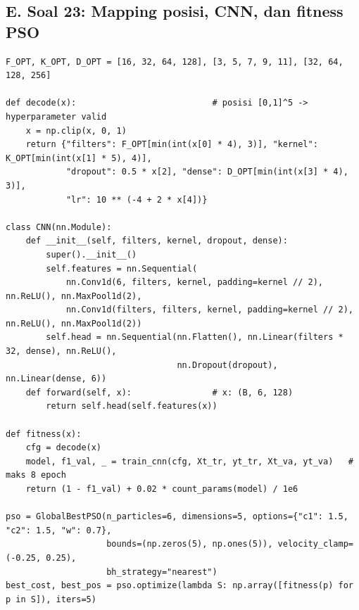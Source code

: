 \subsection*{E. Soal 23: Mapping posisi, CNN, dan fitness PSO}
\begin{lstlisting}
F_OPT, K_OPT, D_OPT = [16, 32, 64, 128], [3, 5, 7, 9, 11], [32, 64, 128, 256]

def decode(x):                           # posisi [0,1]^5 -> hyperparameter valid
    x = np.clip(x, 0, 1)
    return {"filters": F_OPT[min(int(x[0] * 4), 3)], "kernel": K_OPT[min(int(x[1] * 5), 4)],
            "dropout": 0.5 * x[2], "dense": D_OPT[min(int(x[3] * 4), 3)],
            "lr": 10 ** (-4 + 2 * x[4])}

class CNN(nn.Module):
    def __init__(self, filters, kernel, dropout, dense):
        super().__init__()
        self.features = nn.Sequential(
            nn.Conv1d(6, filters, kernel, padding=kernel // 2), nn.ReLU(), nn.MaxPool1d(2),
            nn.Conv1d(filters, filters, kernel, padding=kernel // 2), nn.ReLU(), nn.MaxPool1d(2))
        self.head = nn.Sequential(nn.Flatten(), nn.Linear(filters * 32, dense), nn.ReLU(),
                                  nn.Dropout(dropout), nn.Linear(dense, 6))
    def forward(self, x):                # x: (B, 6, 128)
        return self.head(self.features(x))

def fitness(x):
    cfg = decode(x)
    model, f1_val, _ = train_cnn(cfg, Xt_tr, yt_tr, Xt_va, yt_va)   # maks 8 epoch
    return (1 - f1_val) + 0.02 * count_params(model) / 1e6

pso = GlobalBestPSO(n_particles=6, dimensions=5, options={"c1": 1.5, "c2": 1.5, "w": 0.7},
                    bounds=(np.zeros(5), np.ones(5)), velocity_clamp=(-0.25, 0.25),
                    bh_strategy="nearest")
best_cost, best_pos = pso.optimize(lambda S: np.array([fitness(p) for p in S]), iters=5)
\end{lstlisting}
